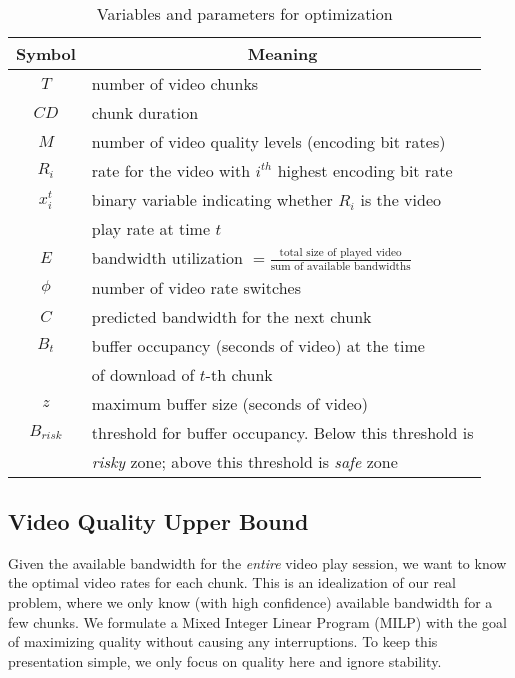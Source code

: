 \begin{table} [bt]
\small
\begin{tabular} {|c |l |}
\hline
\textbf{Symbol}&\multicolumn{1}{c|}{\textbf{Meaning} }\\ \hline
$T$ &number of video chunks  \\ \hline
$CD$ & chunk duration  \\ \hline
$M$ &number of video quality levels (encoding bit rates)\\ \hline
$R_i$& rate for the video with $i^{th}$ highest encoding bit rate \\ \hline
$x_i^t$& binary variable indicating whether $R_i$ is the video \\
& play rate at time $t$ \\ \hline
$E$& bandwidth utilization $= \frac{\mbox{total size of played
    video}}{\mbox{sum of available bandwidths}}$ \\ \hline
$\phi$ &number of video rate switches \\ \hline
$C $ & predicted bandwidth for the next chunk\\ \hline
$B_t $ & buffer occupancy (seconds of video) at the time \\
     & of download of $t$-th chunk \\ \hline
$z $ &maximum buffer size (seconds of video) \\ \hline
$B_{risk} $ & threshold for buffer occupancy. Below this threshold is\\
& \emph{risky} zone; above this threshold is \emph{safe} zone \\ \hline
\end{tabular}
\centering
\caption{Variables and parameters for optimization}
\label{tab:notation}
\end{table}
\subsection{Video Quality Upper Bound}\label{subsec:offline}


Given the available bandwidth for the \emph{entire} video play
session, we want to know the optimal video rates for each chunk. This
is an idealization of our real problem, where we only know (with high
confidence) available bandwidth for a few chunks.
We formulate a Mixed Integer Linear Program (MILP) with the goal of
maximizing quality without causing any interruptions. To keep this
presentation simple, we only focus on quality here and ignore stability. 

